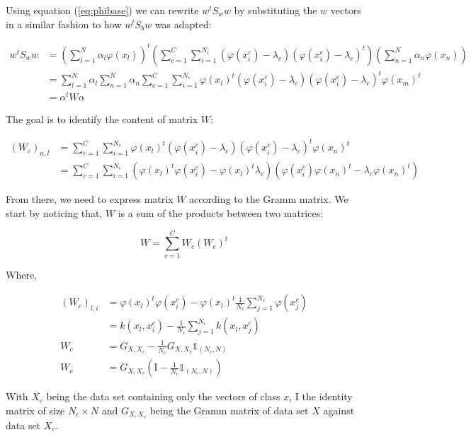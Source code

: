 Using equation (\ref{eq:phibase}) we can rewrite $w^tS_ww$ by substituting the $w$ vectors in a similar fashion
to how $w^tS_bw$ was adapted:

\begin{align*}
  w^tS_ww &= \left( \sum_{l=1}^N \alpha_l \varphi(x_l)\right)^t
             \left( \sum_{c=1}^C \sum_{i=1}^{N_c} (\varphi(x_i^c) - \lambda_c) (\varphi(x_i^c) - \lambda_c)^t\right) \left( \sum_{n=1}^N \alpha_n \varphi(x_n)\right) \\
          &= \sum_{l=1}^N \alpha_l \sum_{n=1}^N \alpha_n \sum_{c=1}^C
          \sum_{i=1}^{N_c} \varphi(x_l)^t(\varphi(x_i^c) - \lambda_c)
                                 (\varphi(x_i^c) - \lambda_c)^t  \varphi(x_m)^t\\
&= \alpha^tW\alpha
\end{align*}


The goal is to identify the content of matrix $W$:

\begin{align*}
  (W_c)_{n,l} &= \sum_{c=1}^C \sum_{i=1}^{N_c}
                  \varphi(x_l)^t(\varphi(x_i^c) - \lambda_c)(\varphi(x_i^c) - \lambda_c)^t\varphi(x_n)^t \\
            &= \sum_{c=1}^C \sum_{i=1}^{N_c} (\varphi(x_l)^t\varphi(x_i^c) -
            \varphi(x_l)^t\lambda_c) (\varphi(x_i^c)\varphi(x_n)^t -
            \lambda_c \varphi(x_n)^t)
\end{align*}

From there, we need to express matrix $W$ according to the Gramm matrix. We start by noticing that,
$W$ is a sum of the products between two matrices:

\begin{equation*}
W = \sum_{c=1}^C W_c (W_c)^t
\end{equation*}

Where,

\begin{align*}
  (W_c)_{l, i} &= \varphi(x_l)^t\varphi(x_i^c) - \varphi(x_l)^t \frac{1}{N_c}\sum_{j=1}^{N_c}\varphi(x_j^c) \\
             &= k(x_l, x_i^c) - \frac{1}{N_c}\sum_{j=1}^{N_c}k(x_l, x_j^c) \\
   W_c       &= G_{X, X_c} - \frac{1}{N_c} G_{X, X_c} \mathds{1}_{(N_c, N)} \\
   W_c       &= G_{X, X_c} \left(\textrm{I} - \frac{1}{N_c}\mathds{1}_{(N_c, N)}\right)
\end{align*}

With $X_c$ being the data set containing only the vectors of class $x$, $\textrm{I}$ the identity matrix of
size $N_c \times N$ and
$G_{X, X_c}$ being the Gramm matrix of data set $X$ against data set $X_c$.


